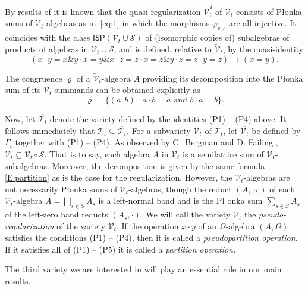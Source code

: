 \documentclass{birkau}
\def\Om{\Omega}
\newcommand{\mcV}{\mathcal{V}}
\newcommand{\mcT}{\mathcal{T}}
\newcommand{\mcS}{\mathcal{S}}
\def\tV{\widetilde{\mcV}}
\def\tqV{\widetilde{\mcV}^q}
\def\tT{\widetilde{\mcT_t}}
\def\oT{\overline{\mcT_t}}
\theoremstyle{plain}
\theoremstyle{definition}
\numberwithin{equation}{section}
\begin{document}
By results of \cite{BR96} it is known that the quasi-regularization $\tqV_t$ of $\mcV_t$
consists of P\l onka sums of $\mcV_t$-algebras as in~\eqref{eq:1} in which the morphisms
$\varphi_{r,s}$ are all injective. It coincides with the class
$\mathsf{I}\mathsf{S}\mathsf{P}(\mcV_t \cup \mcS)$ of (isomorphic copies of) subalgebras
of products of algebras in $\mcV_t \cup \mcS$, and is defined, relative to $\tV_t$, by the quasi-identity
\begin{equation*}
(x \cdot y = x \mathbin{\&} y \cdot x = y \mathbin{\&} x \cdot z = z \cdot x = z \mathbin{\&} y
\cdot z = z \cdot y = z) \rightarrow (x = y).
\end{equation*}

The congruence $\varrho$ of a $\tV_t$-algebra $A$ providing its decomposition into the P\l onka sum of its $\mcV_t$-summands can be obtained explicitly as
\begin{equation}\label{E:partition}
\varrho = \{(a,b) \mid a \cdot b = a\,\, \mbox{and}\,\, b \cdot a = b\}.
\end{equation}

Now, let $\oT$ denote the variety defined by the identities (P1) -- (P4)
above. It follows immediately that $\tT \subseteq \overline{\mcT_t}$. For a subvariety
$\mcV_t$ of $\mcT_t$, let $\overline{\mcV_t}$ be defined by $\Gamma_t$ together with (P1)
-- (P4). As observed by C.~Bergman and D. Failing \cite{BF15},
$\overline{\mcV_t} \subseteq \mcV_t \circ \mcS$. That is to say, each algebra $A$ in
$\overline{\mcV_t}$ is a semilattice sum of  $\mcV_t$-subalgebras. Moreover, the
decomposition is given by the same formula \eqref{E:partition} as is the case for the
regularization. However, the $\overline{\mcV_t}$-algebras are not necessarily P\l onka
sums of $\mcV_t$-algebras, though the reduct $(A, \cdot_t)$ of each
$\overline{\mcV_t}$-algebra $A = \bigsqcup_{s \in S}A_s$ is a left-normal band and is the P\l
onka sum $\sum_{s \in S}A_s$ of the left-zero band reducts $(A_s, \cdot)$. We will call
the variety $\overline{\mcV_t}$ the \emph{pseudo-regularization} of the variety $\mcV_t$.
If the operation $x \cdot y$ of an $\Om$-algebra $(A, \Om)$ satisfies the conditions (P1)
-- (P4), then it is called a \emph{pseudopartition operation.} If it
satisfies all of (P1) -- (P5) it is called a \emph{partition operation.}

The third variety we are interested in will play an essential role in our main results.
\end{document}
